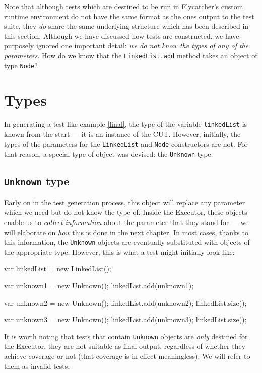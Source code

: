 Note that although tests which are destined to be run in \textsf{Flycatcher}'s custom runtime environment do not have the same format as the ones output to the test suite, they \emph{do} share the same underlying structure which has been described in this section. Although we have discussed how tests are constructed, we have purposely ignored one important detail: \emph{we do not know the types of any of the parameters}. How do we know that the \texttt{LinkedList.add} method takes an object of type \texttt{Node}?

\section{Types}

In generating a test like example \ref{final}, the type of the variable \texttt{linkedList} is known from the start --- it is an instance of the CUT. However, initially, the types of the parameters for the \texttt{LinkedList} and \texttt{Node} constructors are not. For that reason, a special type of object was devised: the \texttt{Unknown} type.

\subsection{\texttt{Unknown} type}

Early on in the test generation process, this object will replace any parameter which we need but do not know the type of. Inside the \textsf{Executor}, these objects enable us to \emph{collect information} about the parameter that they stand for --- we will elaborate on \emph{how} this is done in the next chapter. In most cases, thanks to this information, the \texttt{Unknown} objects are eventually substituted with objects of the appropriate type. However, this is what a test might initially look like:

\begin{code}[caption=Unknown parameter types, label=unknowns]
var linkedList = new LinkedList();

var unknown1 = new Unknown();
linkedList.add(unknown1);

var unknown2 = new Unknown();
linkedList.add(unknown2);
linkedList.size();

var unknown3 = new Unknown();
linkedList.add(unknown3);
linkedList.size();
\end{code}

It is worth noting that tests that contain \texttt{Unknown} objects are \emph{only} destined for the \textsf{Executor}, they are not suitable as final output, regardless of whether they achieve coverage or not (that coverage is in effect meaningless). We will refer to them as invalid tests.

